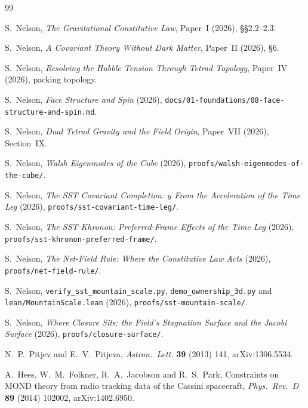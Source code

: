\documentclass[twocolumn]{iopjournal}
\begin{document}

\begin{thebibliography}{99}

S.~Nelson, \textit{The Gravitational Constitutive Law}, Paper~I
(2026), \S\S2.2--2.3.

S.~Nelson, \textit{A Covariant Theory Without Dark Matter}, Paper~II
(2026), \S6.

S.~Nelson, \textit{Resolving the Hubble Tension Through Tetrad
Topology}, Paper~IV (2026), packing topology.

S.~Nelson, \textit{Face Structure and Spin} (2026),
\texttt{docs/01-foundations/}\linebreak\texttt{08-face-structure-and-spin.md}.

S.~Nelson, \textit{Dual Tetrad Gravity and the Field Origin},
Paper~VII (2026), Section~IX.

S.~Nelson, \textit{Walsh Eigenmodes of the Cube} (2026),
\texttt{proofs/walsh-eigenmodes-of-the-cube/}.

S.~Nelson,
\textit{The SST Covariant Completion: $y$ From the Acceleration of the
Time Leg} (2026), \texttt{proofs/sst-covariant-time-leg/}.

S.~Nelson,
\textit{The SST Khronon: Preferred-Frame Effects of the Time Leg}
(2026), \texttt{proofs/sst-khronon-preferred-frame/}.

S.~Nelson,
\textit{The Net-Field Rule: Where the Constitutive Law Acts} (2026),
\texttt{proofs/net-field-rule/}.

S.~Nelson,
\texttt{verify\_sst\_mountain\_scale.py},
\texttt{demo\_ownership\_3d.py} and
\texttt{lean/MountainScale.lean} (2026),
\texttt{proofs/sst-mountain-scale/}.

S.~Nelson, \textit{Where Closure Sits: the Field's Stagnation Surface
and the Jacobi Surface} (2026), \texttt{proofs/closure-surface/}.

N.~P.~Pitjev and E.~V.~Pitjeva,
\textit{Astron.\ Lett.} \textbf{39} (2013) 141, arXiv:1306.5534.

A.~Hees, W.~M.~Folkner, R.~A.~Jacobson and R.~S.~Park, Constraints on
MOND theory from radio tracking data of the Cassini spacecraft,
\textit{Phys.\ Rev.\ D} \textbf{89} (2014) 102002, arXiv:1402.6950.


\end{thebibliography}
\end{document}
